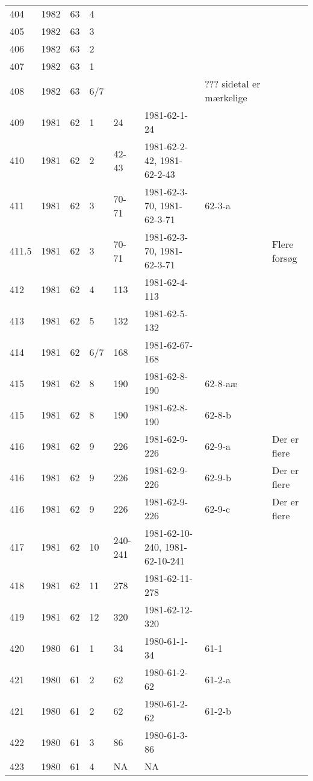 \begin{longtable}{ |l|l|l|l|l|l|l|l| }
404 & 1982 & 63 &     4 &         &                &  & \\
405 & 1982 & 63 &     3 &         &                &  & \\
406 & 1982 & 63 &     2 &         &                &  & \\
407 & 1982 & 63 &     1 &         &                &  & \\
408 & 1982 & 63 &   6/7 &         &                & ??? sidetal er mærkelige & \\
409 & 1981 & 62 &     1 &      24 &   1981-62-1-24 &  & \\
410 & 1981 & 62 &     2 &   42-43 & 1981-62-2-42, 1981-62-2-43 &  & \\
411 & 1981 & 62 &     3 &   70-71 & 1981-62-3-70, 1981-62-3-71 & 62-3-a & \\
411.5 & 1981 & 62 &   3 &   70-71 & 1981-62-3-70, 1981-62-3-71 &  & Flere forsøg \\
412 & 1981 & 62 &     4 &     113 &  1981-62-4-113 &  & \\
413 & 1981 & 62 &     5 &     132 &  1981-62-5-132 &  & \\
414 & 1981 & 62 &   6/7 &     168 & 1981-62-67-168 &  & \\
415 & 1981 & 62 &     8 &     190 &  1981-62-8-190 & 62-8-aæ & \\
415 & 1981 & 62 &     8 &     190 &  1981-62-8-190 & 62-8-b & \\
416 & 1981 & 62 &     9 &     226 &  1981-62-9-226 &  62-9-a & Der er flere \\
416 & 1981 & 62 &     9 &     226 &  1981-62-9-226 &  62-9-b & Der er flere \\
416 & 1981 & 62 &     9 &     226 &  1981-62-9-226 &  62-9-c & Der er flere \\
417 & 1981 & 62 &    10 & 240-241 & 1981-62-10-240, 1981-62-10-241 &  & \\
418 & 1981 & 62 &    11 &     278 & 1981-62-11-278 &  & \\
419 & 1981 & 62 &    12 &     320 & 1981-62-12-320 &  & \\
420 & 1980 & 61 &     1 &      34 &   1980-61-1-34 & 61-1 & \\
421 & 1980 & 61 &     2 &      62 &   1980-61-2-62 & 61-2-a & \\
421 & 1980 & 61 &     2 &      62 &   1980-61-2-62 & 61-2-b & \\
422 & 1980 & 61 &     3 &      86 &   1980-61-3-86 &  & \\
423 & 1980 & 61 &     4 &      NA &    NA          &  & \\

\end{longtable}
